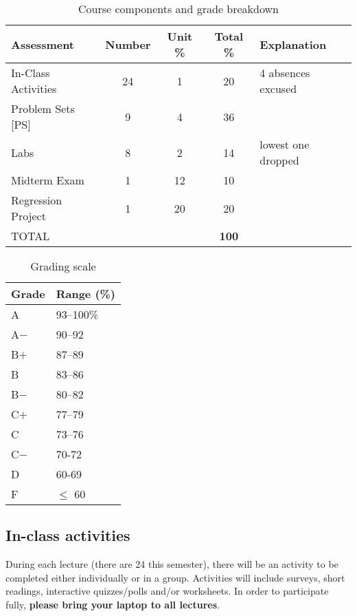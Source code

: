 \documentclass[11pt,twoside]{article}
\numberwithin{equation}{section}
\newcommand{\?}{\stackrel{?}{=}}
\begin{document}
\begin{table}[h!]
  \centering
  \caption{Course components and grade breakdown}
  \label{tab:comp}  
  \begin{tabular}{l c c c l}\toprule
    \bf Assessment & \bf Number & \bf Unit \% & \bf Total \%  & \bf Explanation\\ \midrule
    In-Class Activities  & 24 & 1 & 20 & 4 absences excused \\
    Problem Sets [PS] & 9 & 4 & 36 &\\
    Labs & 8 & 2 & 14 & lowest one dropped \\
    Midterm Exam         & 1 & 12 & 10 &\\
    Regression Project   & 1 & 20 & 20 & \\ \midrule
    TOTAL & & & \bf 100 & \\
    \bottomrule
  \end{tabular}
\end{table}

\begin{table}[h!]
   \centering
 \caption{Grading scale}
 \label{tab:scale}
   \begin{tabular}{l l}\toprule
   Grade & Range (\%) \\\midrule
   A & 93--100\%   \\
   A$-$ & 90--92 \\
   B$+$ & 87--89 \\
   B &   83--86 \\
   B$-$ & 80--82 \\
   C$+$  & 77--79\\
   C   & 73--76 \\
   C$-$ & 70-72 \\
   D & 60-69 \\
   F &  $\le$ 60\\\bottomrule
 \end{tabular}
\end{table}

\subsection{In-class activities}
During each lecture (there are 24 this semester), there will be an activity to be completed either individually or in a group. Activities will include surveys, short readings, interactive quizzes/polls and/or worksheets.
In order to participate fully, \textbf{please bring your laptop to all lectures}.
\end{document}
